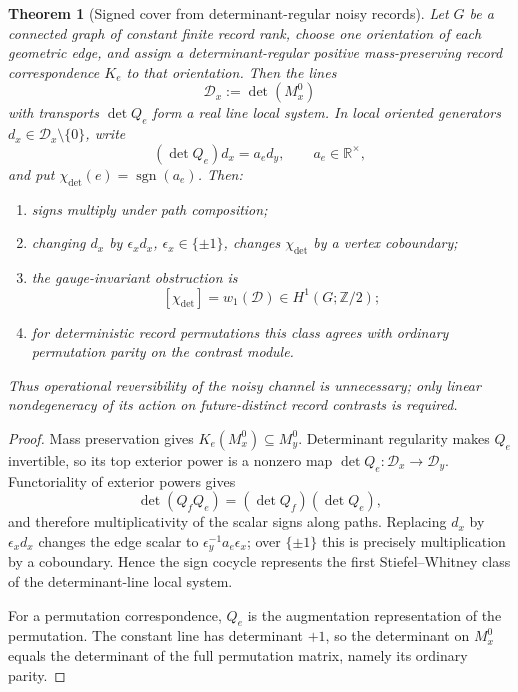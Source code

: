 \documentclass[11pt]{article}
\newtheorem{theorem}{Theorem}[section]
\theoremstyle{definition}
\theoremstyle{remark}
\newcommand{\R}{\mathbb R}
\newcommand{\sgn}{\operatorname{sgn}}
\newcommand{\Ztwo}{\mathbb Z/2}
\begin{document}
\begin{theorem}[Signed cover from determinant-regular noisy records]
\label{thm:noisy-record-orientation}
Let $G$ be a connected graph of constant finite record rank, choose one
orientation of each geometric edge, and assign a determinant-regular positive
mass-preserving record correspondence $K_e$ to that orientation.  Then the
lines
\[
 \mathscr D_x:=\det(M_x^0)
\]
with transports $\det Q_e$ form a real line local system.  In local oriented
generators $d_x\in\mathscr D_x\setminus\{0\}$, write
\[
 (\det Q_e)d_x=a_ed_y,\qquad a_e\in\R^\times,
\]
and put $\chi_{\det}(e)=\sgn(a_e)$.  Then:
\begin{enumerate}[label=\textup{(\roman*)},leftmargin=2.4em]
\item signs multiply under path composition;
\item changing $d_x$ by $\epsilon_xd_x$, $\epsilon_x\in\{\pm1\}$, changes
      $\chi_{\det}$ by a vertex coboundary;
\item the gauge-invariant obstruction is
      \[
       \boxed{
       [\chi_{\det}]
       =w_1(\mathscr D)\in H^1(G;\Ztwo);}
      \]
\item for deterministic record permutations this class agrees with ordinary
      permutation parity on the contrast module.
\end{enumerate}
Thus operational reversibility of the noisy channel is unnecessary; only
linear nondegeneracy of its action on future-distinct record contrasts is
required.
\end{theorem}

\begin{proof}
Mass preservation gives
$K_e(M_x^0)\subseteq M_y^0$.  Determinant regularity makes $Q_e$ invertible, so
its top exterior power is a nonzero map
$\det Q_e:\mathscr D_x\to\mathscr D_y$.  Functoriality of exterior powers gives
\[
 \det(Q_fQ_e)=(\det Q_f)(\det Q_e),
\]
and therefore multiplicativity of the scalar signs along paths.  Replacing
$d_x$ by $\epsilon_xd_x$ changes the edge scalar to
$\epsilon_y^{-1}a_e\epsilon_x$; over $\{\pm1\}$ this is precisely multiplication
by a coboundary.  Hence the sign cocycle represents the first
Stiefel--Whitney class of the determinant-line local system.

For a permutation correspondence, $Q_e$ is the augmentation representation of
the permutation.  The constant line has determinant $+1$, so the determinant
on $M_x^0$ equals the determinant of the full permutation matrix, namely its
ordinary parity.
\end{proof}
\end{document}
